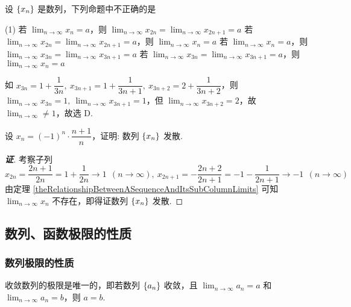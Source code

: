 \begin{example}[2015 数三]
    设 $\qty{x_n}$ 是数列，下列命题中不正确的是 
    \begin{tasks}(1)
        \task 若 $\displaystyle\lim_{n\to\infty}x_n=a$，则 $\displaystyle\lim_{n\to\infty}x_{2n}=\lim_{n\to\infty}x_{2n+1}=a$
        \task 若 $\displaystyle\lim_{n\to\infty}x_{2n}=\lim_{n\to\infty}x_{2n+1}=a$，则 $\displaystyle\lim_{n\to\infty}x_n=a$
        \task 若 $\displaystyle\lim_{n\to\infty}x_n=a$，则 $\displaystyle\lim_{n\to\infty}x_{3n}=\lim_{n\to\infty}x_{3n+1}=a$
        \task 若 $\displaystyle\lim_{n\to\infty}x_{3n}=\lim_{n\to\infty}x_{3n+1}=a$，则 $\displaystyle\lim_{n\to\infty}x_n=a$
    \end{tasks}
\end{example}
\begin{solution}
    如 $x_{3n}=1+\dfrac{1}{3n},~x_{3n+1}=1+\dfrac{1}{3n+1},~x_{3n+2}=2+\dfrac{1}{3n+2}$，则 $\displaystyle\lim_{n\to\infty}x_{3n}=1,~\lim_{n\to\infty}x_{3n+1}=1$，但 $\displaystyle\lim_{n\to\infty}x_{3n+2}=2$，故 $\displaystyle\lim_{n\to\infty}\neq 1$，故选 D.
\end{solution}

\begin{example}
    设 $x_n=(-1)^{n}\cdot\dfrac{n+1}{n}$，证明: 数列 $\qty{x_n}$ 发散.
\end{example}
\begin{proof}[{\songti \textbf{证}}]
    考察子列
    $$x_{2n}=\dfrac{2n+1}{2n}=1+\dfrac{1}{2n}\to 1~~(n\to\infty),~x_{2n+1}=-\dfrac{2n+2}{2n+1}=-1-\dfrac{1}{2n+1}\to-1~~(n\to\infty)$$
    由定理 \ref{theRelationshipBetweenASequenceAndItsSubColumnLimits} 可知 $\displaystyle\lim_{n\to\infty}x_n$ 不存在，即得证数列 $\qty{x_n}$ 发散.
\end{proof}

\subsection{数列、函数极限的性质}

\subsubsection{数列极限的性质}

\begin{theorem}[数列极限的唯一性]
    收敛数列的极限是唯一的，即若数列 $\qty{a_n}$ 收敛，且 $\displaystyle\lim_{n\to\infty}a_n=a$ 和 $\displaystyle\lim_{n\to\infty}a_n=b$，则 $a=b$.
\end{theorem}

